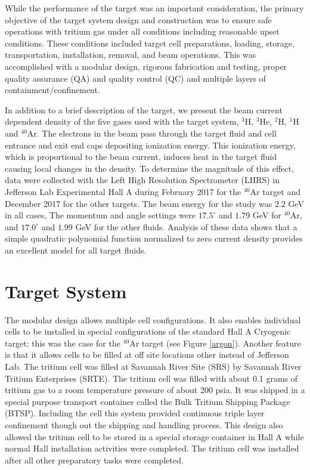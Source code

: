 \documentclass[final,5p,times,twocolumn]{elsarticle}
\begin{document}
While the performance of the target was an important consideration, the primary objective of the target system design and construction was to ensure safe operations with tritium gas under all conditions including reasonable upset conditions. These conditions included target cell preparations, loading, storage, transportation, installation, removal, and beam operations. This was accomplished with a modular design, rigorous fabrication and testing, proper quality assurance (QA) and quality control (QC) and multiple layers of containment/confinement. 
 
In addition to a brief description of the target, we present the beam current dependent density of the five gases used 
with the target system, $^{3}$H, $^{3}$He, $^{2}$H, $^{1}$H and $^{40}$Ar. The electrons in the beam pass through the target fluid and cell entrance and exit end caps depositing ionization energy. This ionization energy, which is proportional to the beam current, induces heat in the target fluid causing local changes in the density. To determine the magnitude of this effect, data were collected with the Left High Resolution Spectrometer (LHRS) in Jefferson Lab Experimental Hall A during February 2017 for the $^{40}$Ar target and December 2017 for the other targets. The beam energy for the study was $2.2$ GeV in all cases, The momentum and angle settings were $17.5 ^\circ $ and $1.79$ GeV for $^{40}$Ar, and $17.0 ^\circ $ and $1.99$ GeV for the other fluids. Analysis of these data shows that a simple quadratic polynomial function normalized to zero current density provides an excellent model for all target fluids.


\section{Target System}

The modular design allows multiple cell configurations. It also enables individual cells to be installed in special configurations of the standard Hall A Cryogenic target; this was the case for the ${^40}$Ar target (see Figure \ref{argon}). Another feature is that it allows cells to be filled at off site locations other instead of Jefferson Lab. The tritium cell was filled at Savannah River Site (SRS) by Savannah River Tritium Enterprises (SRTE). The tritium cell was filled with about 0.1 grams of tritium gas to a room temperature pressure of about 200 psia. It was shipped in a special purpose transport container called the Bulk Tritium Shipping Package (BTSP). Including the cell this system provided continuous triple layer confinement though out the shipping and handling process. This design also allowed the tritium cell to be stored in a special storage container in Hall A while normal Hall installation activities were completed. The tritium cell was installed after all other preparatory tasks were completed.
\end{document}
